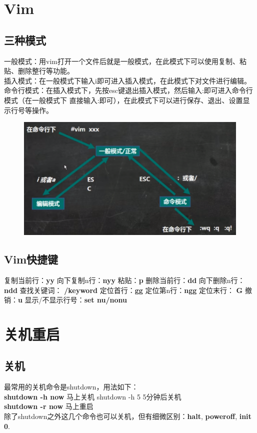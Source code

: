 \documentclass[11pt]{article}
\begin{document}
\section{Vim}

\subsection{三种模式}
 一般模式：用vim打开一个文件后就是一般模式，在此模式下可以使用复制、粘贴、删除整行等功能。  \\
 插入模式：在一般模式下输入i即可进入插入模式，在此模式下对文件进行编辑。  \\
 命令行模式：在插入模式下，先按esc键退出插入模式，然后输入:即可进入命令行模式（在一般模式下
直接输入:即可），在此模式下可以进行保存、退出、设置显示行号等操作。
\begin{figure}[htb]
    \centering
    \includegraphics[scale=0.18]{imgs/vim_mode.png}
\end{figure}

\subsection{Vim快捷键}
复制当前行：\textbf{yy} \qquad 向下复制n行：\textbf{nyy} \qquad 粘贴：\textbf{p} \qquad
删除当前行：\textbf{dd} \qquad 向下删除n行：\textbf{ndd} \qquad 查找关键词：\textbf{
/keyword} \qquad 定位首行：\textbf{gg} \qquad 定位第n行：\textbf{ngg} \qquad 定位末行：
\textbf{G} \qquad 撤销：\textbf{u} \qquad 显示/不显示行号：\textbf{set nu/nonu}

\section{关机重启}

\subsection{关机}
最常用的关机命令是shutdown，用法如下： \\
\textbf{shutdown -h now} \qquad 马上关机 \qquad shutdown -h 5 \qquad 5分钟后关机 \\
\textbf{shutdown -r now} \qquad 马上重启 \\
除了shutdown之外这几个命令也可以关机，但有细微区别：\textbf{halt}, \textbf{poweroff}, \textbf{init 0}.
\end{document}
